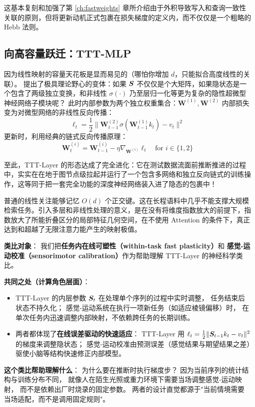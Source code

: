 这基本复刻和加强了第 \ref{ch:fastweights} 章所介绍由于外积导致写入和查询一致性关联的原则，但将更新动机正式包裹在损失梯度的定义内，而不仅仅是一个粗略的 Hebb 法则。

\subsection{向高容量跃迁：TTT-MLP}
因为线性映射的容量天花板是显而易见的（哪怕你增加 $d$，只能拟合高度线性的关联）。\citet{sun2024learning} 提出了极具理论野心的变体：如果 $\boldsymbol{S}$ 不仅仅是个大矩阵，如果隐状态是一个包含了两级独立变换，和非线性 $\sigma(\cdot)$ 乃至层归一化等更为复杂的隐性超微型神经网络子模块呢？
此时内部参数为两个独立权重集合：$\mathbf{W}^{(1)}, \mathbf{W}^{(2)}$
内部损失变为对微型网络的非线性反向传播：
\begin{equation}
   \ell_t = \frac{1}{2} \| \mathbf{W}^{(2)}_{t-1} \sigma(\mathbf{W}^{(1)}_{t-1} k_t) - v_t \|^2
\end{equation}
更新时，利用经典的链式反向传播原理：
\begin{equation}
   \mathbf{W}^{(i)}_{t} = \mathbf{W}^{(i)}_{t-1} - \eta \nabla_{\mathbf{W}^{(i)}} \ell_t \quad \text{for } i \in \{1, 2\}
\end{equation}

至此，TTT-Layer 的形态达成了完全进化：它在测试数据流面前推断推进的过程中，实实在在地于图节点级拉起并运行了一个包含多网络和独立反向链式的训练操作，这等同于把一套完全功能的深度神经网络装入进了隐态的包裹中！

\begin{insight}[title=表达力突破与 TTT-MLP]
普通的线性关注能够记忆 $O(d)$ 个正交键。这在长程语料中几乎不能支撑大规模检索任务。引入多层和非线性处理的意义，是在没有将维度指数放大的前提下，指数放大了所能折叠区分的局部特征几何空间，在不使用 Attention 的条件下，真正达到和超越了无限注意力能产生的映射极值。
\end{insight}

\begin{neurosciencebox}[title=神经科学直觉：任务内可塑性与感觉-运动校准]
\textbf{类比对象}：
我们把\textbf{任务内在线可塑性（within-task fast plasticity）}和
\textbf{感觉-运动校准（sensorimotor calibration）}作为帮助理解 TTT-Layer 的神经科学类比。

\textbf{共同之处（计算角色层面）}：
\begin{itemize}
  \item TTT-Layer 的内层参数 $\boldsymbol{S}_t$ 在处理单个序列的过程中实时调整，
    任务结束后状态不持久化；
    感觉-运动系统在执行一项新任务（如适应棱镜偏移）时，
    在单次任务内迅速调整内部映射，不依赖跨任务的长期训练。
  \item 两者都体现了\textbf{在线误差驱动的快速适应}：
    TTT-Layer 用 $\ell_t = \tfrac{1}{2}\|\boldsymbol{S}_{t-1}k_t - v_t\|^2$ 的梯度来调整隐状态；
    感觉-运动校准由预测误差（感觉结果与期望结果之差）驱使小脑等结构快速修正内部模型。
\end{itemize}

\textbf{这个类比帮助理解什么}：
为什么要在推断时执行梯度步？
因为当前序列的统计结构与训练分布不同，
就像人在陌生光照或重力环境下需要当场调整感觉-运动映射，
而不是依赖出厂时烧录的固定参数。
两者的设计直觉都源于"当前情境需要当场适配，而不是调用固定规则"。
\end{neurosciencebox}

